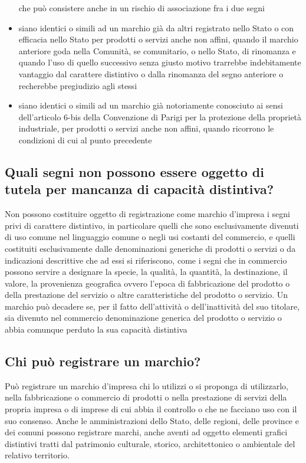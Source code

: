 \begin{itemize}
    che può consistere anche in un rischio di associazione fra i due segni
    \item siano identici o simili ad un marchio già da altri registrato nello Stato o con efficacia nello Stato per prodotti o servizi anche non affini,
    quando il marchio anteriore goda nella Comunità, se comunitario, o nello Stato, di rinomanza e quando l'uso di quello successivo senza giusto motivo trarrebbe indebitamente vantaggio
    dal carattere distintivo o dalla rinomanza del segno anteriore o recherebbe pregiudizio agli stessi
    \item siano identici o simili ad un marchio già notoriamente conosciuto ai sensi dell'articolo 6-bis della Convenzione di Parigi per la protezione della proprietà industriale, per prodotti
    o servizi anche non affini, quando ricorrono le condizioni di cui al punto precedente

\end{itemize}


\subsection{Quali segni non possono essere oggetto di tutela per mancanza di capacità distintiva?}
Non possono costituire oggetto di registrazione come marchio d'impresa i segni privi di carattere distintivo, in particolare
quelli che sono esclusivamente divenuti di uso comune nel linguaggio comune o negli usi costanti del commercio, e quelli
costituiti esclusivamente dalle denominazioni generiche di prodotti o servizi o da indicazioni descrittive che ad essi si
riferiscono, come i segni che in commercio possono servire a designare la specie, la qualità, la quantità, la destinazione,
il valore, la provenienza geografica ovvero l'epoca di fabbricazione del prodotto o della prestazione del servizio o altre caratteristiche
del prodotto o servizio.\newline
Un marchio può decadere se, per il fatto dell'attività o dell'inattività del suo titolare, sia divenuto nel commercio denominazione
generica del prodotto o servizio o abbia comunque perduto la sua capacità distintiva

\subsection{Chi può registrare un marchio?}
Può registrare un marchio d'impresa chi lo utilizzi o si proponga di utilizzarlo, nella fabbricazione o commercio di prodotti
o nella prestazione di servizi della propria impresa o di imprese di cui abbia il controllo o che ne facciano uso con il suo consenso.\newline
Anche le amministrazioni dello Stato, delle regioni, delle province e dei comuni possono registrare marchi, anche aventi ad oggetto elementi grafici distintivi
tratti dal patrimonio culturale, storico, architettonico o ambientale del relativo territorio. \newline

